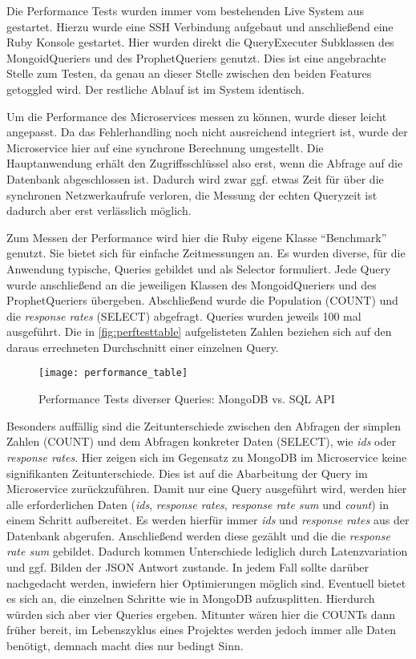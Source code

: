 Die Performance Tests wurden immer vom bestehenden Live System aus gestartet. Hierzu wurde eine SSH Verbindung aufgebaut und anschließend eine Ruby Konsole gestartet. Hier wurden direkt die QueryExecuter Subklassen des MongoidQueriers und des ProphetQueriers genutzt. Dies ist eine angebrachte Stelle zum Testen, da genau an dieser Stelle zwischen den beiden Features getoggled wird. Der restliche Ablauf ist im System identisch.

Um die Performance des Microservices messen zu können, wurde dieser leicht angepasst. Da das Fehlerhandling noch nicht ausreichend integriert ist, wurde der Microservice hier auf eine synchrone Berechnung umgestellt. Die Hauptanwendung erhält den Zugriffsschlüssel also erst, wenn die Abfrage auf die Datenbank abgeschlossen ist. Dadurch wird zwar ggf. etwas Zeit für über die synchronen Netzwerkaufrufe verloren, die Messung der echten Queryzeit ist dadurch aber erst verlässlich möglich.

Zum Messen der Performance wird hier die Ruby eigene Klasse ``Benchmark'' genutzt. Sie bietet sich für einfache Zeitmessungen an. 
Es wurden diverse, für die Anwendung typische, Queries gebildet und als Selector formuliert. Jede Query wurde anschließend an die jeweiligen Klassen des MongoidQueriers und des ProphetQueriers übergeben. Abschließend wurde die Population (COUNT) und die \textit{response rates} (SELECT) abgefragt. Queries wurden jeweils 100 mal ausgeführt. Die in \autoref{fig:perftesttable} aufgelisteten Zahlen beziehen sich auf den daraus errechneten Durchschnitt einer einzelnen Query.

\begin{figure}[!ht]
    \centering
    \caption{Performance Tests diverser Queries: MongoDB vs. SQL API}
    \label{fig:perftesttable}
    \texttt{[image: performance\_table]}
\end{figure}

Besonders auffällig sind die Zeitunterschiede zwischen den Abfragen der simplen Zahlen (COUNT) und dem Abfragen konkreter Daten (SELECT), wie \textit{ids} oder \textit{response rates}. Hier zeigen sich im Gegensatz zu MongoDB im Microservice keine signifikanten Zeitunterschiede. Dies ist auf die Abarbeitung der Query im Microservice zurückzuführen. Damit nur eine Query ausgeführt wird, werden hier alle erforderlichen Daten (\textit{ids}, \textit{response rates}, \textit{response rate sum} und \textit{count}) in einem Schritt aufbereitet. Es werden hierfür immer \textit{ids} und \textit{response rates} aus der Datenbank abgerufen. Anschließend werden diese gezählt und die die \textit{response rate sum} gebildet. Dadurch kommen Unterschiede lediglich durch Latenzvariation und ggf. Bilden der JSON Antwort zustande.
In jedem Fall sollte darüber nachgedacht werden, inwiefern hier Optimierungen möglich sind. Eventuell bietet es sich an, die einzelnen Schritte wie in MongoDB aufzusplitten. Hierdurch würden sich aber vier Queries ergeben. Mitunter wären hier die COUNTs dann früher bereit, im Lebenszyklus eines Projektes werden jedoch immer alle Daten benötigt, demnach macht dies nur bedingt Sinn. 

